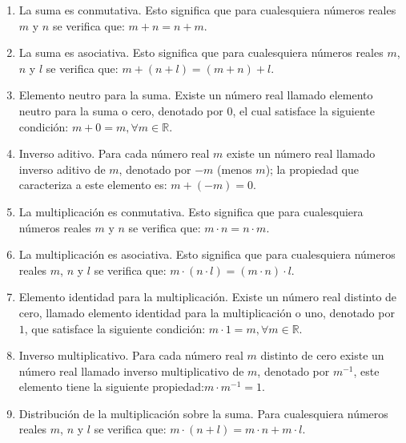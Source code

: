 \documentclass[11pt]{article}
\begin{document}
\begin{enumerate}[label=A\arabic*., font=\bfseries]
    \item La suma es conmutativa. Esto significa que para cualesquiera números reales $m$ y $n$ se verifica que: $ m+n = n+m $.
    \item La suma es asociativa. Esto significa que para cualesquiera números reales $m$, $n$ y $l$ se verifica que: $ m+(n+ l) = (m+ n)+l $.
    \item Elemento neutro para la suma. Existe un número real llamado elemento neutro para la suma o cero, denotado por $0$, el cual satisface la siguiente condición: $ m+0=m,\forall m \in \mathbb{R} $.
    \item Inverso aditivo. Para cada número real $m$ existe un número real llamado inverso aditivo de $m$, denotado por $-m$ (menos $m$); la propiedad que caracteriza a este elemento es: $ m + (-m) = 0 $.
    \item La multiplicación es conmutativa. Esto significa que para cualesquiera números reales $m$ y $n$ se verifica que: $ m \cdot n = n \cdot m $.
    \item La multiplicación es asociativa. Esto significa que para cualesquiera números reales $m$, $n$ y $l$ se verifica que: $ m \cdot (n \cdot l) = (m \cdot n) \cdot l $.
    \item Elemento identidad para la multiplicación. Existe un número real distinto de cero, llamado elemento identidad para la multiplicación o uno, denotado por $1$, que satisface la siguiente condición: $ m \cdot 1 = m,\forall m \in \mathbb{R} $.
    \item Inverso multiplicativo. Para cada número real $m$ distinto de cero existe un número real llamado inverso multiplicativo de $m$, denotado por $m^{-1}$, este elemento tiene la siguiente propiedad:$m \cdot m^{-1} = 1$.
    \item Distribución de la multiplicación sobre la suma. Para cualesquiera números reales $m$, $n$ y $l$ se verifica que: $ m \cdot (n+l)=m \cdot n+m \cdot l $.
\end{enumerate}
\end{document}
